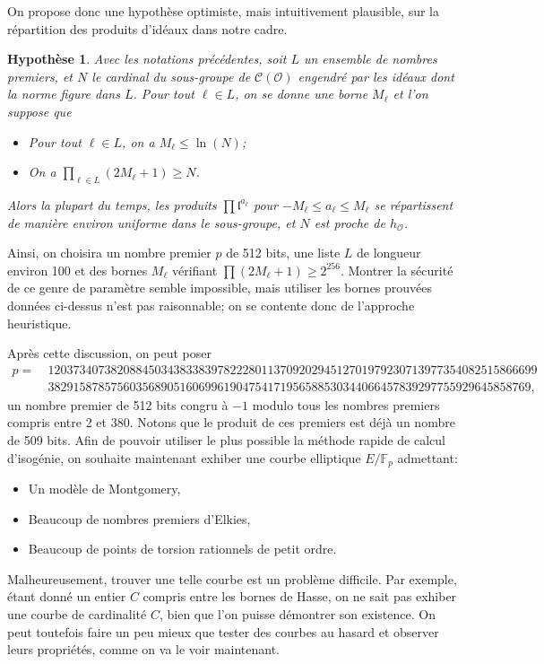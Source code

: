 \documentclass[11pt,a4paper]{article}
\newcommand{\F}{\mathbb{F}}
\renewcommand{\O}{\mathcal{O}}
\newcommand{\Cl}{\mathcal{C}}
\renewcommand{\frak}{\mathfrak}
\renewcommand{\v}{\vspace{5mm}}
\newtheorem*{hyp}{Hypothèse}
\theoremstyle{definition}
\begin{document}
On propose donc une hypothèse optimiste, mais intuitivement plausible, sur la répartition des produits d'idéaux dans notre cadre. 

\begin{hyp}
Avec les notations précédentes, soit $L$ un ensemble de nombres premiers, et $N$ le cardinal du sous-groupe de $\Cl(\O)$ engendré par les idéaux dont la norme figure dans $L$. Pour tout $\ell\in L$, on se donne une borne $M_\ell$ et l'on suppose que
\begin{itemize}
\item[•] Pour tout $\ell\in L$, on a $M_\ell \leq \ln(N)$;
\item[•] On a $\prod_{\ell\in L} (2M_\ell + 1) \geq N$.
\end{itemize}
Alors la plupart du temps, les produits $\prod {\frak l}^{a_\ell}$ pour $-M_\ell \leq a_\ell\leq M_\ell$ se répartissent de manière environ uniforme dans le sous-groupe, et $N$ est proche de $h_\O$.
\end{hyp}

Ainsi, on choisira un nombre premier $p$ de 512 bits, une liste $L$ de longueur environ 100 et des bornes $M_\ell$ vérifiant $\prod (2 M_\ell +1) \geq 2^{256}$. Montrer la sécurité de ce genre de paramètre semble impossible, mais utiliser les bornes prouvées données ci-dessus n'est pas raisonnable; on se contente donc de l'approche heuristique.

\v
Après cette discussion, on peut poser
$$\begin{aligned}
p =\ &120373407382088450343833839782228011370920294512701979230713977354082515866699 \\ &38291587857560356890516069961904754171956588530344066457839297755929645858769,
\end{aligned}
$$
un nombre premier de 512 bits congru à $-1$ modulo tous les nombres premiers compris entre 2 et 380. Notons que le produit de ces premiers est déjà un nombre de 509 bits. Afin de pouvoir utiliser le plus possible la méthode rapide de calcul d'isogénie, on souhaite maintenant exhiber une courbe elliptique $E/\F_p$ admettant:
\begin{itemize}
\item[•] Un modèle de Montgomery,
\item[•] Beaucoup de nombres premiers d'Elkies,
\item[•] Beaucoup de points de torsion rationnels de petit ordre.
\end{itemize}

Malheureusement, trouver une telle courbe est un problème difficile. Par exemple, étant donné un entier $C$ compris entre les bornes de Hasse, on ne sait pas exhiber une courbe de cardinalité $C$, bien que l'on puisse démontrer son existence. On peut toutefois faire un peu mieux que tester des courbes au hasard et observer leurs propriétés, comme on va le voir maintenant.
\end{document}
